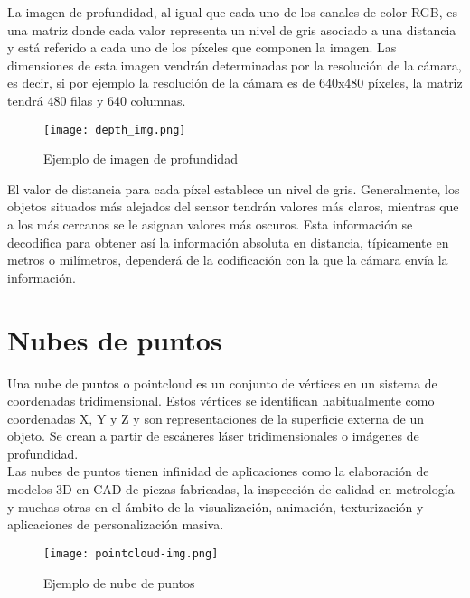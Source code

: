 La imagen de profundidad, al igual que cada uno de los canales de color RGB, es una matriz donde cada valor representa un nivel de gris asociado a una distancia y está referido a cada uno de los píxeles que componen la imagen. Las dimensiones de esta imagen vendrán determinadas por la resolución de la cámara, es decir, si por ejemplo la resolución de la cámara es de 640x480 píxeles, la matriz tendrá 480 filas y 640 columnas. \\

\begin{figure}[h]
	\begin{center} 
		\texttt{[image: depth\_img.png]}
	\end{center}
	\caption{Ejemplo de imagen de profundidad}
	\label{fig:depth}
\end{figure}


El valor de distancia para cada píxel establece un nivel de gris. Generalmente, los objetos situados más alejados del sensor tendrán valores más claros, mientras que a los más cercanos se le asignan valores más oscuros. Esta información se decodifica para obtener así la información absoluta en distancia, típicamente en metros o milímetros, dependerá de la codificación con la que la cámara envía la información.\\

\section{Nubes de puntos}

Una nube de puntos o pointcloud es un conjunto de vértices en un sistema de coordenadas tridimensional. Estos vértices se identifican habitualmente como coordenadas X, Y y Z y son representaciones de la superficie externa de un objeto. Se crean a partir de escáneres láser tridimensionales o imágenes de profundidad.\\

Las nubes de puntos tienen infinidad de aplicaciones como la elaboración de modelos 3D en CAD de piezas fabricadas, la inspección de calidad en metrología y muchas otras en el ámbito de la visualización, animación, texturización y aplicaciones de personalización masiva.\\

\begin{figure}[h]
	\begin{center} 
		\texttt{[image: pointcloud-img.png]}
	\end{center}
	\caption{Ejemplo de nube de puntos}
	\label{fig:pc}
\end{figure}

